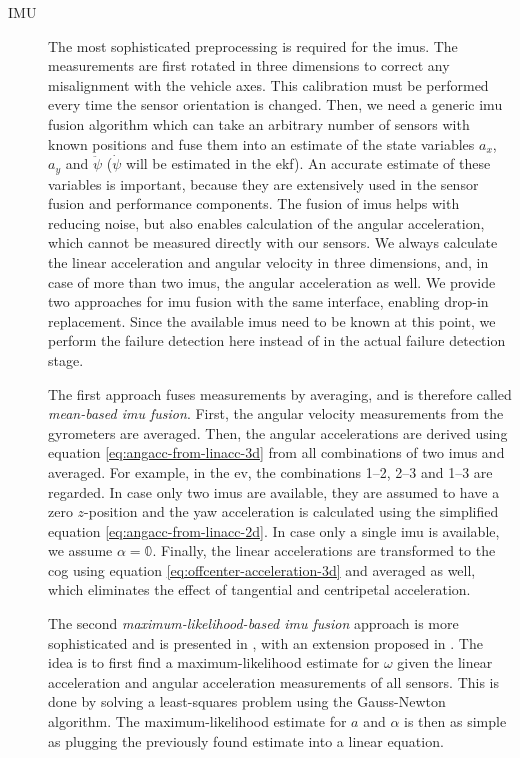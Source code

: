 \begin{description}
\item[IMU] The most sophisticated preprocessing is required for the \glspl{imu}. The measurements are first rotated in three dimensions to correct any misalignment with the vehicle axes. This calibration must be performed every time the sensor orientation is changed. Then, we need a generic \gls{imu} fusion algorithm which can take an arbitrary number of sensors with known positions and fuse them into an estimate of the state variables $a_x$, $a_y$ and $\ddot{\psi}$ ($\dot{\psi}$ will be estimated in the \gls{ekf}). An accurate estimate of these variables is important, because they are extensively used in the sensor fusion and performance components. The fusion of \glspl{imu} helps with reducing noise, but also enables calculation of the angular acceleration, which cannot be measured directly with our sensors. We always calculate the linear acceleration and angular velocity in three dimensions, and, in case of more than two \glspl{imu}, the angular acceleration as well. We provide two approaches for \gls{imu} fusion with the same interface, enabling drop-in replacement. Since the available \glspl{imu} need to be known at this point, we perform the failure detection here instead of in the actual failure detection stage.

The first approach fuses measurements by averaging, and is therefore called \textit{mean-based \gls{imu} fusion}. First, the angular velocity measurements from the gyrometers are averaged. Then, the angular accelerations are derived using equation \ref{eq:angacc-from-linacc-3d} from all combinations of two \glspl{imu} and averaged. For example, in the \gls{ev}, the combinations 1--2, 2--3 and 1--3 are regarded. In case only two \glspl{imu} are available, they are assumed to have a zero $z$-position and the yaw acceleration is calculated using the simplified equation \ref{eq:angacc-from-linacc-2d}. In case only a single \gls{imu} is available, we assume $\alpha = \mathbb{0}$. Finally, the linear accelerations are transformed to the \gls{cog} using equation \ref{eq:offcenter-acceleration-3d} and averaged as well, which eliminates the effect of tangential and centripetal acceleration.

The second \textit{maximum-likelihood-based \gls{imu} fusion} approach is more sophisticated and is presented in \cite{Skog.2016}, with an extension proposed in \cite{Wahlstrom.2018}. The idea is to first find a maximum-likelihood estimate for $\omega$ given the linear acceleration and angular acceleration measurements of all sensors. This is done by solving a least-squares problem using the Gauss-Newton algorithm. The maximum-likelihood estimate for $a$ and $\alpha$ is then as simple as plugging the previously found estimate into a linear equation.


\end{description}
